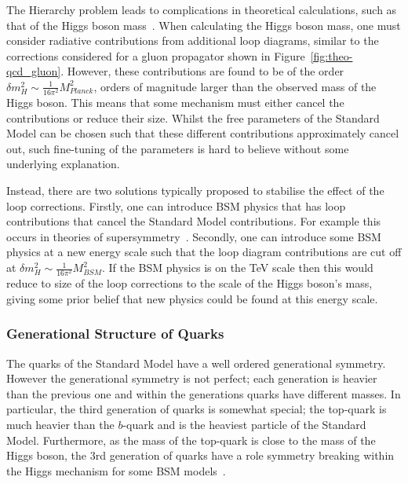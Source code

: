 The Hierarchy problem leads to complications in theoretical calculations, such as that of the Higgs boson mass~\cite{theo-hierarchy}.
When calculating the Higgs boson mass, one must consider
radiative contributions from additional loop diagrams,
similar to the corrections considered for a gluon propagator shown in Figure~\ref{fig:theo-qcd_gluon}. %
However, these contributions are found to be of the order $\delta m_H^2 \sim \frac{1}{16\pi^2} M_{Planck}^2$\hspace{0.2mm},
orders of magnitude larger than the observed mass of the Higgs boson.
This means that some mechanism must either cancel the contributions or reduce their size.
Whilst the free parameters of the Standard Model can be chosen such that these different contributions approximately cancel out,
such fine-tuning of the parameters is hard to believe without some underlying explanation.

Instead, there are two solutions typically proposed to stabilise the effect of the loop corrections.
Firstly, one can introduce BSM physics that has loop contributions that cancel the Standard Model contributions.
For example this occurs in theories of supersymmetry~\cite{theo-bsm_susy}.
Secondly, one can introduce some BSM physics at a new energy scale
such that the loop diagram contributions are cut off at $\delta m_H^2 \sim \frac{1}{16\pi^2} M_{BSM}^2$.
If the BSM physics is on the TeV scale then this would reduce to size of the loop corrections to the scale of the Higgs boson's mass,
giving some prior belief that new physics could be found at this energy scale.

\subsubsection{Generational Structure of Quarks}
\label{sec:theo-bsm_3g}

The quarks of the Standard Model have a well ordered generational symmetry.
However the generational symmetry is not perfect;
each generation is heavier than the previous one
and within the generations quarks have different masses.
In particular, the third generation of quarks is somewhat special;
the top-quark is much heavier than the $b$-quark
and is the heaviest particle of the Standard Model.
Furthermore, as the mass of the top-quark is close to the mass of the Higgs boson,
the 3rd generation of quarks have a role symmetry breaking within the Higgs mechanism for some BSM models~\cite{theo-bsm_top}.

